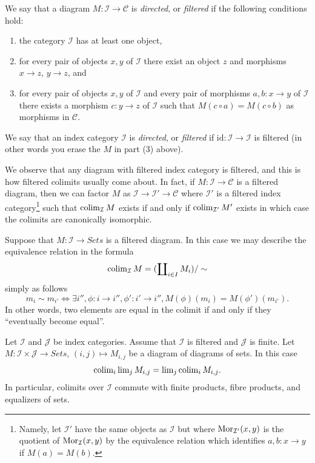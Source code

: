 \begin{definition}
\label{definition-directed}
We say that a diagram $M : \mathcal{I} \to \mathcal{C}$ is {\it directed},
or {\it filtered} if the following conditions hold:
\begin{enumerate}
\item the category $\mathcal{I}$ has at least one object,
\item for every pair of objects $x, y$ of $\mathcal{I}$
there exist an object $z$ and morphisms $x \to z$,
$y \to z$, and
\item for every pair of objects $x, y$ of $\mathcal{I}$
and every pair of morphisms $a, b : x \to y$ of $\mathcal{I}$
there exists a morphism $c : y \to z$ of $\mathcal{I}$
such that $M(c \circ a) = M(c \circ b)$ as morphisms in $\mathcal{C}$.
\end{enumerate}
We say that an index category $\mathcal{I}$ is {\it directed}, or
{\it filtered} if $\text{id} : \mathcal{I} \to \mathcal{I}$ is filtered
(in other words you erase the $M$ in part (3) above).
\end{definition}

\noindent
We observe that any diagram with filtered index category is filtered,
and this is how filtered colimits usually come about. In fact, if
$M : \mathcal{I} \to \mathcal{C}$ is a filtered diagram, then we
can factor $M$ as $\mathcal{I} \to \mathcal{I}' \to \mathcal{C}$
where $\mathcal{I}'$ is a filtered index category\footnote{Namely, let
$\mathcal{I}'$ have the same objects as $\mathcal{I}$ but
where $\mathop{\mathrm{Mor}}\nolimits_{\mathcal{I}'}(x, y)$ is the quotient of $\mathop{\mathrm{Mor}}\nolimits_\mathcal{I}(x, y)$
by the equivalence relation which identifies
$a, b : x \to y$ if $M(a) = M(b)$.}
such that $\mathop{\mathrm{colim}}\nolimits_\mathcal{I} M$ exists if and only if
$\mathop{\mathrm{colim}}\nolimits_{\mathcal{I}'} M'$ exists in which case the colimits are
canonically isomorphic.

\medskip\noindent
Suppose that $M : \mathcal{I} \to \textit{Sets}$ is a filtered diagram. In
this case we may describe the equivalence relation in the formula
$$
\mathop{\mathrm{colim}}\nolimits_\mathcal{I} M
=
(\coprod\nolimits_{i\in I} M_i)/\sim
$$
simply as follows
$$
m_i \sim m_{i'}
\Leftrightarrow
\exists i'', \phi : i \to i'', \phi': i' \to i'',
M(\phi)(m_i) = M(\phi')(m_{i'}).
$$
In other words, two elements are equal in the colimit if and only if
they ``eventually become equal''.

\begin{lemma}
\label{lemma-directed-commutes}
Let $\mathcal{I}$ and $\mathcal{J}$ be index categories.
Assume that $\mathcal{I}$ is filtered and $\mathcal{J}$ is finite.
Let $M : \mathcal{I} \times \mathcal{J} \to \textit{Sets}$,
$(i, j) \mapsto M_{i, j}$ be a diagram of diagrams of sets.
In this case
$$
\mathop{\mathrm{colim}}\nolimits_i \mathop{\mathrm{lim}}\nolimits_j M_{i, j}
=
\mathop{\mathrm{lim}}\nolimits_j \mathop{\mathrm{colim}}\nolimits_i M_{i, j}.
$$
In particular, colimits over $\mathcal{I}$ commute with finite products,
fibre products, and equalizers of sets.
\end{lemma}

